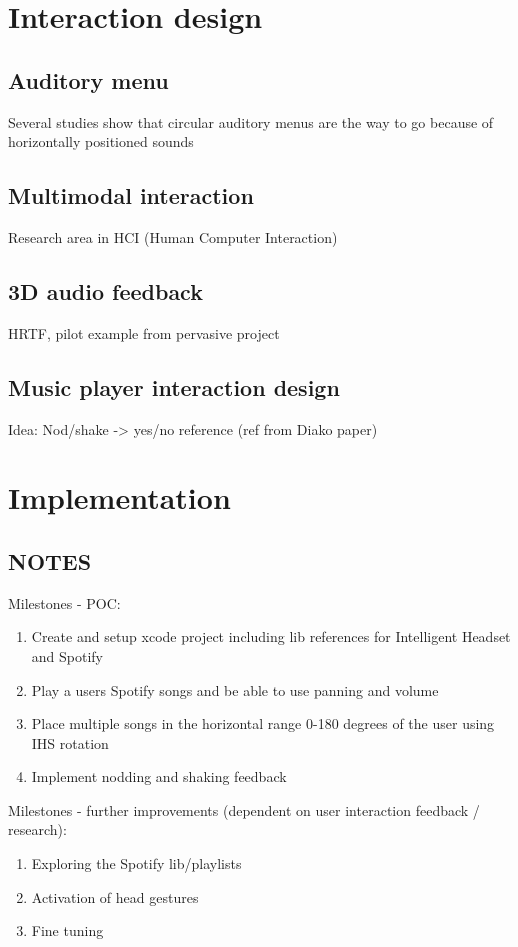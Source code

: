 \documentclass{article}
\begin{document}
\section{Interaction design}

\subsection{Auditory menu}
Several studies show that circular auditory menus are the way to go because of horizontally positioned sounds 

\subsection{Multimodal interaction}
Research area in HCI (Human Computer Interaction)

\subsection{3D audio feedback}
HRTF, pilot example from pervasive project

\subsection{Music player interaction design}
Idea: Nod/shake -> yes/no reference (ref from Diako paper)


\section{Implementation}

\subsection{NOTES}

Milestones - POC:
\begin{enumerate}
\item Create and setup xcode project including lib references for Intelligent Headset and Spotify
\item Play a users Spotify songs and be able to use panning and volume
\item Place multiple songs in the horizontal range 0-180 degrees of the user using IHS rotation
\item Implement nodding and shaking feedback
\end{enumerate}

Milestones - further improvements (dependent on user interaction feedback / research):
\begin{enumerate}
\item Exploring the Spotify lib/playlists
\item Activation of head gestures
\item Fine tuning
\end{enumerate}
\end{document}
